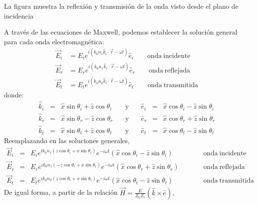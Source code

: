 \documentclass[letterpaper,10pt,english]{jupyterBook}
\let\sphinxpxdimen\pdfpxdimen\else\newdimen\sphinxpxdimen
\begin{document}
\noindent{\hspace*{\fill}\sphinxincludegraphics[width=350\sphinxpxdimen]{{em_reflection}.png}\hspace*{\fill}}

\sphinxAtStartPar
La figura muestra la reflexión y transmisión de la onda visto desde el plano de incidencia

\sphinxAtStartPar
A través de las ecuaciones de Maxwell, podemos establecer la solución general para cada onda electromagnética:
\begin{align*}
\vec{E}_i &= E_i e^{ i\left(k_0n_1\hat{k}_i\cdot\vec{r} - \omega t\right)} \hat{e}_i\quad\quad \mathrm{onda~incidente}
 \\
\vec{E}_r &= E_r e^{ i\left(k_0n_1\hat{k}_r\cdot\vec{r} - \omega t\right)} \hat{e}_r\quad\quad \mathrm{onda~reflejada}
\\
\vec{E}_t &= E_t e^{ i\left(k_0n_2\hat{k}_t\cdot\vec{r} - \omega t\right)} \hat{e}_t\quad\quad 
\mathrm{onda~transmitida}
\end{align*}
\sphinxAtStartPar
donde:
\begin{eqnarray*}
\hat{k}_i &=& \hat{x}\sin\theta_i + \hat{z}\cos\theta_i 
&\quad\mathrm{y}\quad& 
\hat{e}_i &=& \hat{x}\cos\theta_i - \hat{z}\sin\theta_i
\\
\hat{k}_r &=& \hat{x}\sin\theta_r - \hat{z}\cos\theta_r
&\quad\mathrm{y}\quad& 
\hat{e}_r &=& \hat{x}\cos\theta_r + \hat{z}\sin\theta_r
\\
\hat{k}_t &=& \hat{x}\sin\theta_t + \hat{z}\cos\theta_t
&\quad\mathrm{y}\quad& 
\hat{e}_t &=& \hat{x}\cos\theta_t - \hat{z}\sin\theta_t
\end{eqnarray*}
\sphinxAtStartPar
Reemplazando en las soluciones generales,
\begin{eqnarray*}
\vec{E}_i &=& E_i e^{ ik_0n_1\left(z\cos\theta_i + x\sin\theta_i\right)}e^{-i\omega t} \left(\hat{x}\cos\theta_i -\hat{z}\sin\theta_i\right)\quad\quad &&\mathrm{onda~incidente}
 \\
\vec{E}_r &=& E_r e^{ ik_0n_1\left(-z\cos\theta_r + x\sin\theta_r\right)}e^{-i\omega t} \left(\hat{x}\cos\theta_r +\hat{z}\sin\theta_r\right)\quad\quad &&\mathrm{onda~reflejada}
\\
\vec{E}_t &=& E_t e^{ ik_0n_2\left(z\cos\theta_t + x\sin\theta_t\right)}e^{-i\omega t} \left(\hat{x}\cos\theta_t -\hat{z}\sin\theta_t\right)\quad\quad 
&&\mathrm{onda~transmitida}
\end{eqnarray*}
\sphinxAtStartPar
De igual forma, a partir de la relación \(\vec{H} = \frac{E}{Z_0Z_r}\left(\hat{k}\times\hat{e}\right)\),
\end{document}
